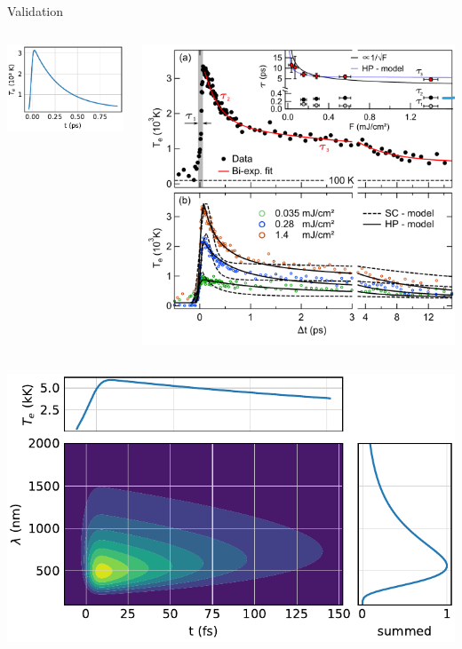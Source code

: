 \begin{frame}{Validation}
	\vfill
	\begin{columns}
		\includegraphics{../model/figures/temperature stange_hot_2015.pdf}

		\includegraphics[width=\textwidth]{./figures/stange_hot_2015.png}
	\end{columns}
\end{frame}

\begin{frame}
	\centering
	\includegraphics{../model/figures/streak view.pdf}
\end{frame}
